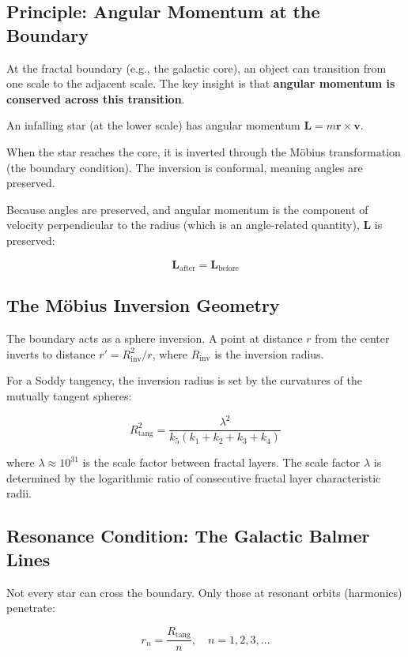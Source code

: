 \documentclass[11pt,a4paper]{article}
\begin{document}
\subsection{Principle: Angular Momentum at the Boundary}

At the fractal boundary (e.g., the galactic core), an object can transition from one scale to the adjacent scale. The key insight is that \textbf{angular momentum is conserved across this transition}.

An infalling star (at the lower scale) has angular momentum $\mathbf{L} = m\mathbf{r} \times \mathbf{v}$.

When the star reaches the core, it is inverted through the Möbius transformation (the boundary condition). The inversion is conformal, meaning angles are preserved.

Because angles are preserved, and angular momentum is the component of velocity perpendicular to the radius (which is an angle-related quantity), $\mathbf{L}$ is preserved:

\[
\mathbf{L}_{\text{after}} = \mathbf{L}_{\text{before}}
\]

\subsection{The Möbius Inversion Geometry}

The boundary acts as a sphere inversion. A point at distance $r$ from the center inverts to distance $r' = R_{\text{inv}}^2 / r$, where $R_{\text{inv}}$ is the inversion radius.

For a Soddy tangency, the inversion radius is set by the curvatures of the mutually tangent spheres:

\[
R_{\text{tang}}^2 = \frac{\lambda^2}{k_5(k_1 + k_2 + k_3 + k_4)}
\]

where $\lambda \approx 10^{31}$ is the scale factor between fractal layers. The scale factor $\lambda$ is determined by the logarithmic ratio of consecutive fractal layer characteristic radii.

\subsection{Resonance Condition: The Galactic Balmer Lines}

Not every star can cross the boundary. Only those at resonant orbits (harmonics) penetrate:

\[
r_n = \frac{R_{\text{tang}}}{n}, \quad n = 1, 2, 3, \ldots
\]
\end{document}
